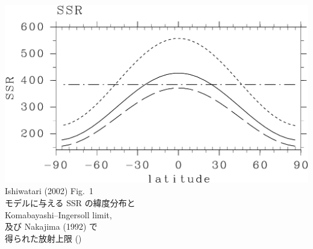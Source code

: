 \documentclass[aspectratio=149,9pt,]{beamer}
\begin{document}
\begin{frame}
\begin{columns}[T,onlytextwidth]
\begin{column}{.45\textwidth}
			\includegraphics[width=.8\textwidth]{./fig/SSR.kps-crop.pdf}\\
			Ishiwatari \etal (2002) Fig.~1\\
			モデルに与える SSR の緯度分布と\\
			Komabayashi--Ingersoll limit,\\
			及び Nakajima \etal (1992) で\\
			得られた放射上限 ()
		\end{column}
	\end{columns}
\end{frame}
\end{document}
